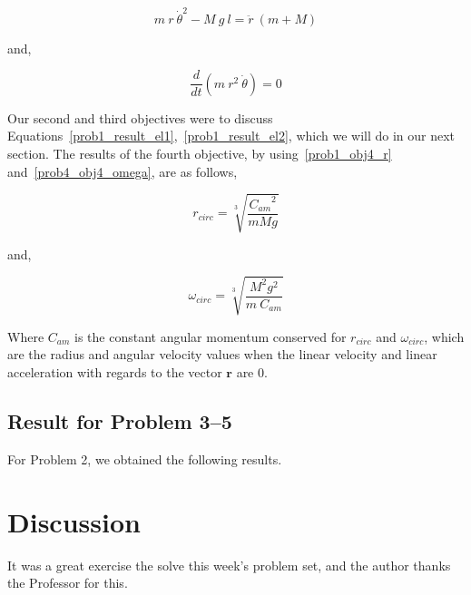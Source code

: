 \documentclass[conference]{IEEEtran}
\begin{document}
\begin{equation}\label{prob1_result_el1}
    \boxed{
        m~r~\dot{\theta}^2 - M~g~l = \ddot{r}~(m + M)
    }
\end{equation}

and,

\begin{equation}\label{prob1_result_el2}
    \boxed{
        \frac{d}{dt}\left( m~r^2~\dot{\theta} \right) = 0
    }
\end{equation}

Our second and third objectives were to discuss Equations~\ref{prob1_result_el1},~\ref{prob1_result_el2},
which we will do in our next section. The results of the fourth objective, by using~\ref{prob1_obj4_r}
and~\ref{prob4_obj4_omega}, are as follows,

\begin{equation}
    \boxed{r_{circ} = \sqrt[3]{\frac{{C_{am}}^2}{mMg}}}
\end{equation}

and,

\begin{equation}
    \boxed{\omega_{circ} = \sqrt[3]{\frac{M^2g^2}{m~C_{am}}}}
\end{equation}

Where $C_{am}$ is the constant angular momentum conserved for $r_{circ}$ and $\omega_{circ}$,
which are the radius and angular velocity values when the linear velocity and linear acceleration with
regards to the vector $\textbf{r}$ are 0.

\subsection{Result for Problem 3--5}

For Problem 2, we obtained the following results.

\section{Discussion}

It was a great exercise the solve this week's problem set, and the author thanks
the Professor for this.


\end{document}
